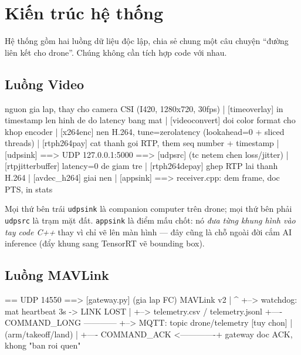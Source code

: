 \documentclass[12pt]{ai_conquer2026}
\begin{document}
\section{Kiến trúc hệ thống}

Hệ thống gồm hai luồng dữ liệu độc lập, chia sẻ chung một câu chuyện ``đường liên
kết cho drone''. Chúng không cần tích hợp code với nhau.

\subsection{Luồng Video}

\begin{aivnoutputbox}   nguon gia lap, thay cho camera CSI (I420, 1280x720, 30fps)
   |
[timeoverlay]    in timestamp len hinh de do latency bang mat
   |
[videoconvert]   doi color format cho khop encoder
   |
[x264enc]        nen H.264, tune=zerolatency (lookahead=0 + sliced threads)
   |
[rtph264pay]     cat thanh goi RTP, them seq number + timestamp
   |
[udpsink] ==> UDP 127.0.0.1:5000 ==> [udpsrc]   (tc netem chen loss/jitter)
                                         |
                                    [rtpjitterbuffer]   latency=0 de giam tre
                                         |
                                    [rtph264depay]   ghep RTP lai thanh H.264
                                         |
                                    [avdec_h264]     giai nen
                                         |
                                    [appsink]   ==> receiver.cpp: dem frame, doc PTS, in stats
\end{aivnoutputbox}

Mọi thứ bên trái \texttt{udpsink} là companion computer trên drone; mọi thứ bên
phải \texttt{udpsrc} là trạm mặt đất. \texttt{appsink} là điểm mấu chốt: nó
\emph{đưa từng khung hình vào tay code C++} thay vì chỉ vẽ lên màn hình --- đây
cũng là chỗ ngoài đời cắm AI inference (đẩy khung sang TensorRT vẽ bounding box).

\subsection{Luồng MAVLink}

\begin{aivnoutputbox}  == UDP 14550 ==>  [gateway.py]
  (gia lap FC)      MAVLink v2         |
       ^                               +--> watchdog: mat heartbeat 3s -> LINK LOST
       |                               +--> telemetry.csv / telemetry.jsonl
       +---- COMMAND_LONG ------------ +--> MQTT: topic drone/telemetry  [tuy chon]
       |     (arm/takeoff/land)        |
       +---- COMMAND_ACK <-------------+  gateway doc ACK, khong "ban roi quen"
\end{aivnoutputbox}
\end{document}
